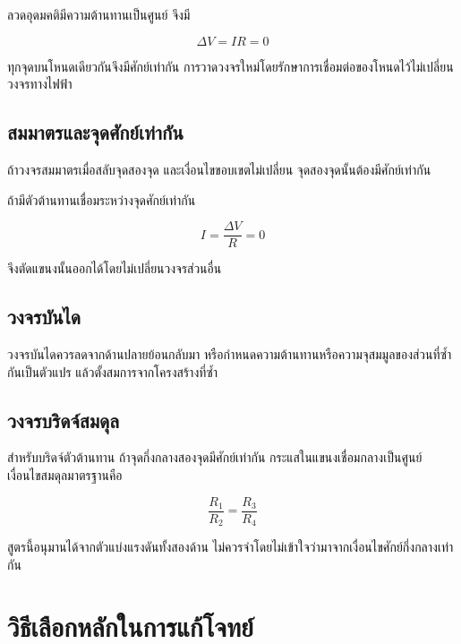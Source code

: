 ลวดอุดมคติมีความต้านทานเป็นศูนย์ จึงมี

\[
\Delta V=IR=0
\]

ทุกจุดบนโหนดเดียวกันจึงมีศักย์เท่ากัน การวาดวงจรใหม่โดยรักษาการเชื่อมต่อของโหนดไว้ไม่เปลี่ยนวงจรทางไฟฟ้า

\subsection{สมมาตรและจุดศักย์เท่ากัน}

ถ้าวงจรสมมาตรเมื่อสลับจุดสองจุด และเงื่อนไขขอบเขตไม่เปลี่ยน จุดสองจุดนั้นต้องมีศักย์เท่ากัน

ถ้ามีตัวต้านทานเชื่อมระหว่างจุดศักย์เท่ากัน

\[
I=\frac{\Delta V}{R}=0
\]

จึงตัดแขนงนั้นออกได้โดยไม่เปลี่ยนวงจรส่วนอื่น

\subsection{วงจรบันได}

วงจรบันไดควรลดจากด้านปลายย้อนกลับมา หรือกำหนดความต้านทานหรือความจุสมมูลของส่วนที่ซ้ำกันเป็นตัวแปร แล้วตั้งสมการจากโครงสร้างที่ซ้ำ

\subsection{วงจรบริดจ์สมดุล}

สำหรับบริดจ์ตัวต้านทาน ถ้าจุดกึ่งกลางสองจุดมีศักย์เท่ากัน กระแสในแขนงเชื่อมกลางเป็นศูนย์ เงื่อนไขสมดุลมาตรฐานคือ

\[
\boxed{\frac{R_1}{R_2}=\frac{R_3}{R_4}}
\]

สูตรนี้อนุมานได้จากตัวแบ่งแรงดันทั้งสองด้าน ไม่ควรจำโดยไม่เข้าใจว่ามาจากเงื่อนไขศักย์กึ่งกลางเท่ากัน

\section{วิธีเลือกหลักในการแก้โจทย์}

